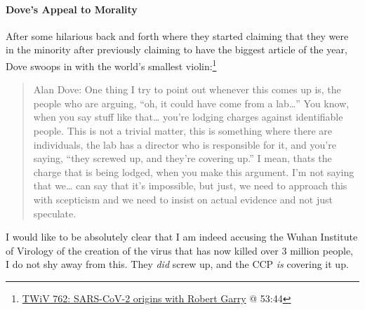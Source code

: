 \documentclass[11pt]{article}
\begin{document}
\paragraph{Dove's Appeal to Morality}
\label{sec:orgf350df7}
After some hilarious back and forth where they started claiming that they were in the minority after previously claiming to have the biggest article of the year, Dove swoops in with the world's smallest violin:\footnote{\href{https://youtu.be/IxwrDSYrhjU?t=3224}{TWiV 762: SARS-CoV-2 origins with Robert Garry} @ 53:44}
\begin{quote}
Alan Dove: One thing I try to point out whenever this comes up is, the people who are arguing, ``oh, it could have come from a lab\ldots{}'' You know, when you say stuff like that\ldots{} you're lodging charges against identifiable people. This is not a trivial matter, this is something where there are individuals, the lab has a director who is responsible for it, and you're saying, ``they screwed up, and they're covering up.'' I mean, thats the charge that is being lodged, when you make this argument. I'm not saying that we\ldots{} can say that it's impossible, but just, we need to approach this with scepticism and we need to insist on actual evidence and not just speculate.
\end{quote}
I would like to be absolutely clear that I am indeed accusing the Wuhan Institute of Virology of the creation of the virus that has now killed over 3 million people, I do not shy away from this. They \emph{did} screw up, and the CCP \emph{is} covering it up.
\end{document}
